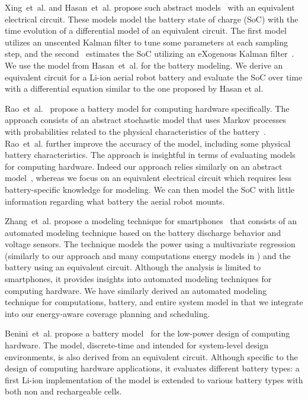 Xing~et~al. and Hasan~et~al. propose such abstract models~\citep{xing2014state,hasan2018exogenous} with an equivalent electrical circuit. These models model the battery state of charge (SoC) with the time evolution of a differential model of an equivalent circuit. The first model~\citep{xing2014state} utilizes an unscented Kalman filter to tune some parameters at each sampling step, and the second~\citep{hasan2018exogenous} estimates the SoC utilizing an eXogenous Kalman filter~\citep{johansen2017exogenous}. We use the model from Hasan~et~al. for the battery modeling. We derive an equivalent circuit for a Li-ion aerial robot battery and evaluate the SoC over time with a differential equation similar to the one proposed by Hasan et al.

Rao~et~al.~\citep{rao2005battery} propose a battery model for computing hardware specifically. The approach consists of an abstract stochastic model that uses Markov processes with probabilities related to the physical characteristics of the battery~\citep{panigrahi2001battery}. Rao~et~al. further improve the accuracy of the model, including some physical battery characteristics. The approach is insightful in terms of evaluating models for computing hardware. Indeed our approach relies similarly on an abstract model~\citep{hasan2018exogenous}, whereas we focus on an equivalent electrical circuit which requires less battery-specific knowledge for modeling. We can then model the SoC with little information regarding what battery the aerial robot mounts.

Zhang~et~al. propose a modeling technique for smartphones~\citep{zhang2010accurate} that consists of an automated modeling technique based on the battery discharge behavior and voltage sensors. The technique models the power using a multivariate regression (similarly to our approach and many computations energy models in ) and the battery using an equivalent circuit. Although the analysis is limited to smartphones, it provides insights into automated modeling techniques for computing hardware. We have similarly derived an automated modeling technique for computations, battery, and entire system model in  that we integrate into our energy-aware coverage planning and scheduling.

Benini~et~al. propose a battery model~\citep{benini2001discrete} for the low-power design of computing hardware. The model, discrete-time and intended for system-level design environments, is also derived from an equivalent circuit. Although specific to the design of computing hardware applications, it evaluates different battery types: a first Li-ion implementation of the model is extended to various battery types with both non and rechargeable cells.


